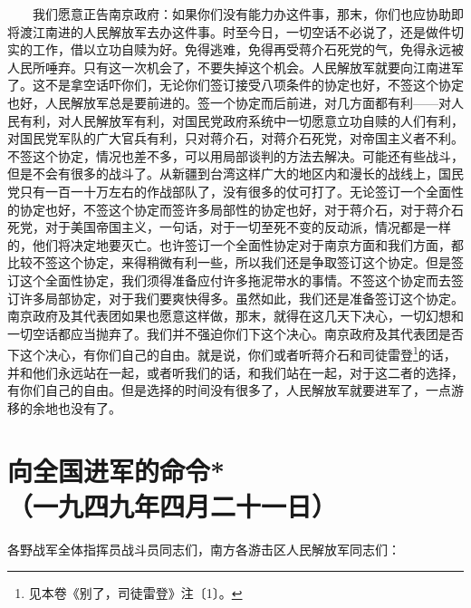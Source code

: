 \documentclass[cn,11pt,chinese]{elegantbook}
\def\myformat#1{\hfil\hfil #1}
\begin{document}
　　我们愿意正告南京政府：如果你们没有能力办这件事，那末，你们也应协助即将渡江南进的人民解放军去办这件事。时至今日，一切空话不必说了，还是做件切实的工作，借以立功自赎为好。免得逃难，免得再受蒋介石死党的气，免得永远被人民所唾弃。只有这一次机会了，不要失掉这个机会。人民解放军就要向江南进军了。这不是拿空话吓你们，无论你们签订接受八项条件的协定也好，不签这个协定也好，人民解放军总是要前进的。签一个协定而后前进，对几方面都有利——对人民有利，对人民解放军有利，对国民党政府系统中一切愿意立功自赎的人们有利，对国民党军队的广大官兵有利，只对蒋介石，对蒋介石死党，对帝国主义者不利。不签这个协定，情况也差不多，可以用局部谈判的方法去解决。可能还有些战斗，但是不会有很多的战斗了。从新疆到台湾这样广大的地区内和漫长的战线上，国民党只有一百一十万左右的作战部队了，没有很多的仗可打了。无论签订一个全面性的协定也好，不签这个协定而签许多局部性的协定也好，对于蒋介石，对于蒋介石死党，对于美国帝国主义，一句话，对于一切至死不变的反动派，情况都是一样的，他们将决定地要灭亡。也许签订一个全面性协定对于南京方面和我们方面，都比较不签这个协定，来得稍微有利一些，所以我们还是争取签订这个协定。但是签订这个全面性协定，我们须得准备应付许多拖泥带水的事情。不签这个协定而去签订许多局部协定，对于我们要爽快得多。虽然如此，我们还是准备签订这个协定。南京政府及其代表团如果也愿意这样做，那末，就得在这几天下决心，一切幻想和一切空话都应当抛弃了。我们并不强迫你们下这个决心。南京政府及其代表团是否下这个决心，有你们自己的自由。就是说，你们或者听蒋介石和司徒雷登\footnote[5]{ 见本卷《别了，司徒雷登》注〔1〕。}的话，并和他们永远站在一起，或者听我们的话，和我们站在一起，对于这二者的选择，有你们自己的自由。但是选择的时间没有很多了，人民解放军就要进军了，一点游移的余地也没有了。\\
\newpage\section*{\myformat{向全国进军的命令*}\\\myformat{（一九四九年四月二十一日）}}
各野战军全体指挥员战斗员同志们，南方各游击区人民解放军同志们：\\
\end{document}
